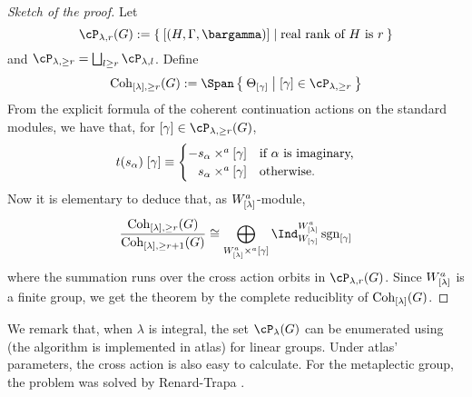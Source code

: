 \documentclass[counting_main.tex]{subfiles}
\begin{document}
\begin{proof}[Sketch of the proof]
 Let
 \[
   \cP_{\lambda,r}(G):= \Set{[(H,\Gamma,\bargamma)]|
     \text{real rank of $H$ is $r$}}
 \]
 and $\cP_{\lambda,\geq r} = \bigsqcup_{l\geq r}\cP_{\lambda,l}$. Define
 \[
   \Coh_{[\lambda],\geq r}(G) :=
   \Span\Set{\Theta_{[\gamma]}|[\gamma]\in \cP_{\lambda,\geq r}}
 \]
 From the explicit formula of the coherent continuation actions on the standard
 modules, we have that, for $[\gamma]\in \cP_{\lambda,\geq r}(G)$,
 \[
   t(s_{\alpha})\; [\gamma]
   \equiv
   \begin{cases}
     - s_{\alpha}\times^a [\gamma] & \text{if $\alpha$ is imaginary,}\\
     \phantom{-} s_{\alpha}\times^a [\gamma] & \text{otherwise.}
   \end{cases}
 \]
 Now it is elementary to deduce that, as $W^a_{[\lambda]}$-module,
 \[
   \frac{\Coh_{[\lambda],\geq r}(G)}{\Coh_{[\lambda],\geq r+1}(G)}
   \cong \bigoplus_{\Wlama \crossa [\gamma]}
   \Ind_{W_{[\gamma]}}^{\Wlama} \sgn_{[\gamma]}
 \]
 where the summation runs over the cross action orbits
 in $\cP_{\lambda,r}(G)$.
 Since $W^a_{[\lambda]}$ is a finite group, we get the theorem by the complete
 reduciblity of $\mathrm{Coh}_{[\lambda]}(G)$.
\end{proof}

We remark that, when $\lambda$ is integral, the set $\cP_{\lambda}(G)$ can be enumerated using \cite{AC} (the
algorithm is implemented in atlas) for linear groups.
Under atlas' parameters, the cross action is also easy to calculate.
For the metaplectic group, the problem was solved by Renard-Trapa \cite{RT1,RT2}.
\end{document}
